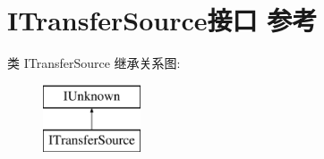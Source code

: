 \hypertarget{interface_i_transfer_source}{}\section{I\+Transfer\+Source接口 参考}
\label{interface_i_transfer_source}
类 I\+Transfer\+Source 继承关系图\+:\begin{figure}[H]
\begin{center}
\leavevmode
\includegraphics[height=2.000000cm]{interface_i_transfer_source}
\end{center}
\end{figure}
